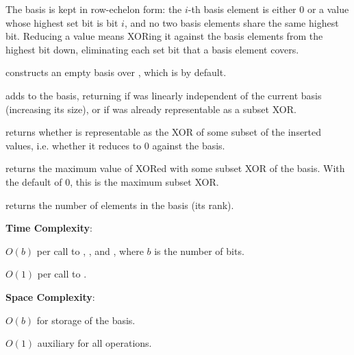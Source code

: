 The basis is kept in row-echelon form: the $i$-th basis element is either $0$ or a value whose highest set bit is bit $i$, and no two basis elements share the same highest bit. Reducing a value means XORing it against the basis elements from the highest bit down, eliminating each set bit that a basis element covers.

\begin{compactitem}
  \item {} constructs an empty basis over , which is  by default.
  \item {} adds  to the basis, returning  if  was linearly independent of the current basis (increasing its size), or  if  was already representable as a subset XOR.
  \item {} returns whether  is representable as the XOR of some subset of the inserted values, i.e. whether it reduces to $0$ against the basis.
  \item {} returns the maximum value of  XORed with some subset XOR of the basis. With the default  of $0$, this is the maximum subset XOR.
  \item {} returns the number of elements in the basis (its rank).
\end{compactitem}

\textbf{Time Complexity}:
\begin{compactitem}
  \item $O(b)$ per call to , , and , where $b$ is the number of bits.
  \item $O(1)$ per call to .
\end{compactitem}

\textbf{Space Complexity}:
\begin{compactitem}
  \item $O(b)$ for storage of the basis.
  \item $O(1)$ auxiliary for all operations.
\end{compactitem}


